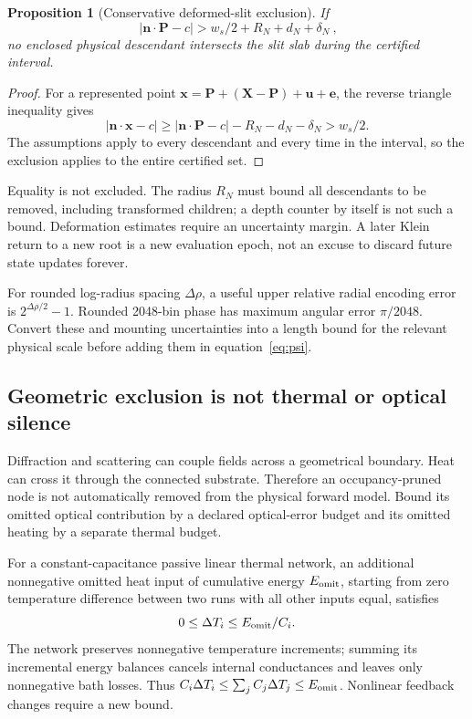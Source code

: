 \documentclass[10pt,a4paper]{article}
\numberwithin{equation}{section}
\newtheorem{proposition}{Proposition}[section]
\begin{document}
\begin{proposition}[Conservative deformed-slit exclusion]
If
\begin{equation}
\boxed{\ |\bm n\cdot\bm P-c|>w_s/2+R_N+d_N+\delta_N\ },
\label{eq:psi}
\end{equation}
no enclosed physical descendant intersects the slit slab during the certified interval.
\end{proposition}
\begin{proof}
For a represented point $\bm x=\bm P+(\bm X-\bm P)+\bm u+\bm e$, the reverse triangle inequality gives
\[
|\bm n\cdot\bm x-c|\ge|\bm n\cdot\bm P-c|-R_N-d_N-\delta_N>w_s/2.
\]
The assumptions apply to every descendant and every time in the interval, so the exclusion applies to the entire certified set.
\end{proof}

Equality is not excluded. The radius $R_N$ must bound all descendants to be removed, including transformed children; a depth counter by itself is not such a bound. Deformation estimates require an uncertainty margin. A later Klein return to a new root is a new evaluation epoch, not an excuse to discard future state updates forever.

For rounded log-radius spacing $\Delta\rho$, a useful upper relative radial encoding error is $2^{\Delta\rho/2}-1$. Rounded 2048-bin phase has maximum angular error $\pi/2048$. Convert these and mounting uncertainties into a length bound for the relevant physical scale before adding them in equation~\eqref{eq:psi}.

\subsection*{Geometric exclusion is not thermal or optical silence}
Diffraction and scattering can couple fields across a geometrical boundary. Heat can cross it through the connected substrate. Therefore an occupancy-pruned node is not automatically removed from the physical forward model. Bound its omitted optical contribution by a declared optical-error budget and its omitted heating by a separate thermal budget.

For a constant-capacitance passive linear thermal network, an additional nonnegative omitted heat input of cumulative energy $E_{\rm omit}$, starting from zero temperature difference between two runs with all other inputs equal, satisfies
\begin{equation}
0\le\Delta T_i\le E_{\rm omit}/C_i.
\end{equation}
The network preserves nonnegative temperature increments; summing its incremental energy balances cancels internal conductances and leaves only nonnegative bath losses. Thus $C_i\Delta T_i\le\sum_j C_j\Delta T_j\le E_{\rm omit}$. Nonlinear feedback changes require a new bound.
\end{document}
